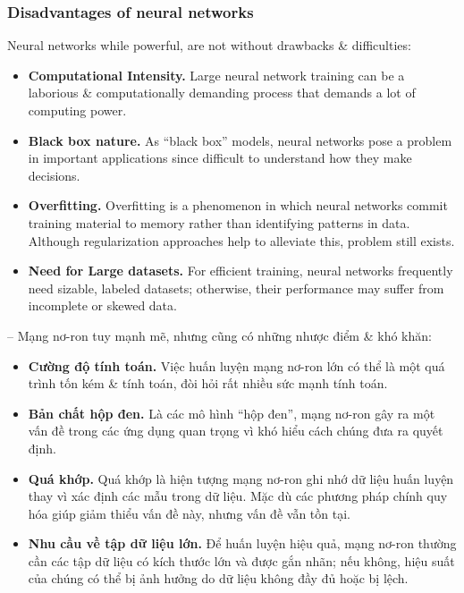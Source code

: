 \documentclass{article}
\begin{document}
\subsubsection{Disadvantages of neural networks}
Neural networks while powerful, are not without drawbacks \& difficulties:
\begin{itemize}
    \item {\bf Computational Intensity.} Large neural network training can be a laborious \& computationally demanding process that demands a lot of computing power.
    \item {\bf Black box nature.} As ``black box'' models, neural networks pose a problem in important applications since difficult to understand how they make decisions.
    \item {\bf Overfitting.} Overfitting is a phenomenon in which neural networks commit training material to memory rather than identifying patterns in data. Although regularization approaches help to alleviate this, problem still exists.
    \item {\bf Need for Large datasets.} For efficient training, neural networks frequently need sizable, labeled datasets; otherwise, their performance may suffer from incomplete or skewed data.
\end{itemize}
-- Mạng nơ-ron tuy mạnh mẽ, nhưng cũng có những nhược điểm \& khó khăn:
\begin{itemize}
    \item {\bf Cường độ tính toán.} Việc huấn luyện mạng nơ-ron lớn có thể là một quá trình tốn kém \& tính toán, đòi hỏi rất nhiều sức mạnh tính toán.
    \item {\bf Bản chất hộp đen.} Là các mô hình ``hộp đen'', mạng nơ-ron gây ra một vấn đề trong các ứng dụng quan trọng vì khó hiểu cách chúng đưa ra quyết định.
    \item {\bf Quá khớp.} Quá khớp là hiện tượng mạng nơ-ron ghi nhớ dữ liệu huấn luyện thay vì xác định các mẫu trong dữ liệu. Mặc dù các phương pháp chính quy hóa giúp giảm thiểu vấn đề này, nhưng vấn đề vẫn tồn tại.
    \item {\bf Nhu cầu về tập dữ liệu lớn.} Để huấn luyện hiệu quả, mạng nơ-ron thường cần các tập dữ liệu có kích thước lớn và được gắn nhãn; nếu không, hiệu suất của chúng có thể bị ảnh hưởng do dữ liệu không đầy đủ hoặc bị lệch.
\end{itemize}

\end{document}
